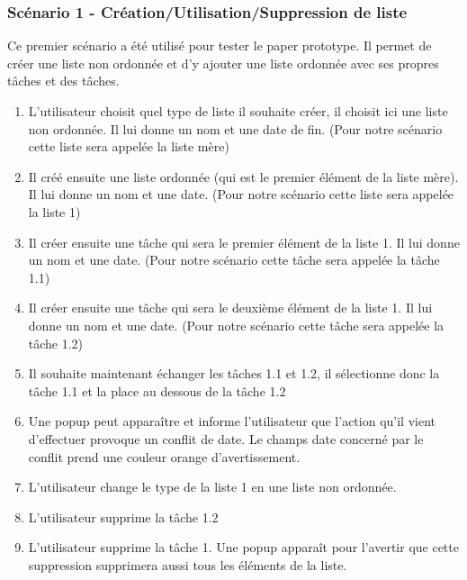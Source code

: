 \documentclass[a4paper,10pt]{article}
\begin{document}
\subsubsection{Scénario 1 - Création/Utilisation/Suppression de liste}
Ce premier scénario a été utilisé pour tester le paper prototype. Il permet de créer une liste non ordonnée et d'y ajouter une liste ordonnée avec ses propres tâches et des tâches.
\begin{enumerate}
\item{L'utilisateur choisit quel type de liste il souhaite créer, il choisit ici une liste non ordonnée. Il lui donne un nom et une date de fin. (Pour notre scénario cette liste sera appelée la liste mère)}
\item{Il créé ensuite une liste ordonnée (qui est le premier élément de la liste mère). Il lui donne un nom et une date. (Pour notre scénario cette liste sera appelée la liste 1)}
\item{Il créer ensuite une tâche qui sera le premier élément de la liste 1. Il lui donne un nom et une date. (Pour notre scénario cette tâche sera appelée la tâche 1.1)}
\item{Il créer ensuite une tâche qui sera le deuxième élément de la liste 1. Il lui donne un nom et une date. (Pour notre scénario cette tâche sera appelée la tâche 1.2)}
\item{Il souhaite maintenant échanger les tâches 1.1 et 1.2, il sélectionne donc la tâche 1.1 et la place au dessous de la tâche 1.2}
\item{Une popup peut apparaître et informe l'utilisateur que l'action qu'il vient d'effectuer provoque un conflit de date. Le champs date concerné par le conflit prend une couleur orange d'avertissement.}
\item{L'utilisateur change le type de la liste 1 en une liste non ordonnée.}
\item{L'utilisateur supprime la tâche 1.2}
\item{L'utilisateur supprime la tâche 1. Une popup apparaît pour l'avertir que cette suppression supprimera aussi tous les éléments de la liste.}
\end{enumerate}
\end{document}
